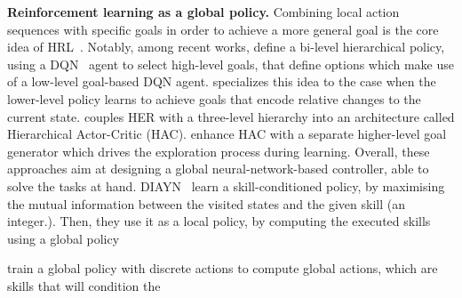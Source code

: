 \textbf{Reinforcement learning as a global policy.}
Combining local action sequences with specific goals in order to achieve a more general goal is the core idea of
HRL~\citep{sutton1999between,precup2000temporal,konidaris2009skill}.
Notably, among recent works, \citet{kulkarni2016hierarchical} define a bi-level hierarchical policy, using a
DQN~\citep{mnih2015human} agent to select high-level goals, that define options which make use of a low-level goal-based
DQN agent.
\citet{nachum2018data} specializes this idea to the case when the lower-level policy learns to achieve goals that
encode relative changes to the current state.
\citet{levy2019learning} couples HER with a three-level hierarchy into an architecture called Hierarchical Actor-Critic
(HAC).
\citet{mcclinton2021hac} enhance HAC with a separate higher-level goal generator which drives the exploration process
during learning.
Overall, these approaches aim at designing a global neural-network-based controller, able to solve the tasks at hand.
DIAYN~\cite{eysenbach2018diversity} learn a skill-conditioned policy, by maximising the mutual information between the 
visited states and the given skill (an integer.).
Then, they use it as a local policy, by computing the executed skills using a global policy 

train a global policy with discrete actions to compute global actions, which are skills that will condition the 



